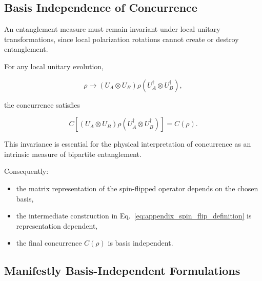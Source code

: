 
\subsection*{Basis Independence of Concurrence}

An entanglement measure must remain invariant under local unitary transformations, since local polarization rotations cannot create or destroy entanglement.

For any local unitary evolution,

\begin{equation}
\rho
\rightarrow
(U_A \otimes U_B)
\rho
(U_A^\dagger \otimes U_B^\dagger),
\label{eq:local_unitary_appendix}
\end{equation}

the concurrence satisfies

\begin{equation}
C
\left[
(U_A \otimes U_B)
\rho
(U_A^\dagger \otimes U_B^\dagger)
\right]
=
C(\rho).
\label{eq:concurrence_local_unitary_invariance}
\end{equation}

This invariance is essential for the physical interpretation of concurrence as an intrinsic measure of bipartite entanglement.

\medskip

Consequently:

\begin{itemize}

\item the matrix representation of the spin-flipped operator depends on the chosen basis,

\item the intermediate construction in Eq.~\eqref{eq:appendix_spin_flip_definition} is representation dependent,

\item the final concurrence \( C(\rho) \) is basis independent.

\end{itemize}


\subsection*{Manifestly Basis-Independent Formulations}


